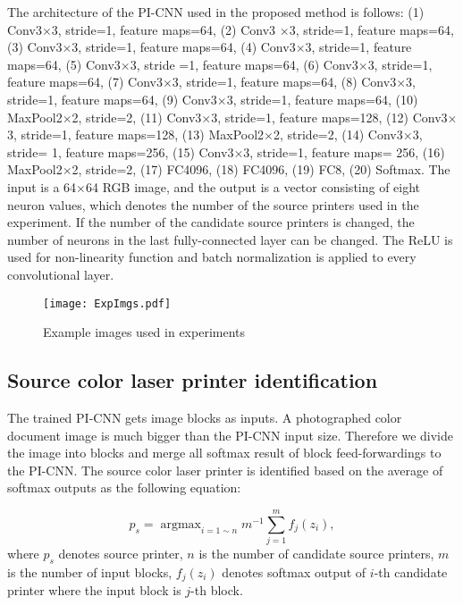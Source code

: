 \documentclass[5p, times]{elsarticle}
\DeclareMathOperator*{\argmax}{argmax}
\begin{document}
The architecture of the PI-CNN used in the proposed method is follows: (1) Conv3$\times$3, stride=1, feature maps=64, (2) Conv3 $\times$3, stride=1, feature maps=64, (3) Conv3$\times$3, stride=1, feature maps=64, (4) Conv3$\times$3, stride=1, feature maps=64, (5) Conv3$\times$3, stride =1, feature maps=64, (6) Conv3$\times$3, stride=1, feature maps=64, (7) Conv3$\times$3, stride=1, feature maps=64, (8) Conv3$\times$3, stride=1, feature maps=64, (9) Conv3$\times$3, stride=1, feature maps=64, (10) MaxPool2$\times$2, stride=2, (11) Conv3$\times$3, stride=1, feature maps=128, (12) Conv3$\times$3, stride=1, feature maps=128, (13) MaxPool2$\times$2, stride=2, (14) Conv3$\times$3, stride= 1, feature maps=256, (15) Conv3$\times$3, stride=1, feature maps= 256, (16) MaxPool2$\times$2, stride=2, (17) FC4096, (18) FC4096, (19) FC8, (20) Softmax. The input is a 64$\times$64 RGB image, and the output is a vector consisting of eight neuron values, which denotes the number of the source printers used in the experiment. If the number of the candidate source printers is changed, the number of neurons in the last fully-connected layer can be changed. The ReLU is used for non-linearity function and batch normalization is applied to every convolutional layer.

\begin{figure}[t]
    \centerline{\texttt{[image: ExpImgs.pdf]}}
    \caption{Example images used in experiments
    } \label{ExpImgs}
\end{figure}

\subsection{Source color laser printer identification}

The trained PI-CNN gets image blocks as inputs. A photographed color document image is much bigger than the PI-CNN input size. Therefore we divide the image into blocks and merge all softmax result of block feed-forwardings to the PI-CNN. The source color laser printer is identified based on the average of softmax outputs as the following equation:

\begin{equation}
p_s = \argmax_{i=1\sim n} m^{-1}\sum^{m}_{j=1}f_j(z_i),
\end{equation}
where $p_s$ denotes source printer, $n$ is the number of candidate source printers, $m$ is the number of input blocks, $f_j(z_i)$ denotes softmax output of $i$-th candidate printer where the input block is $j$-th block.
\end{document}
